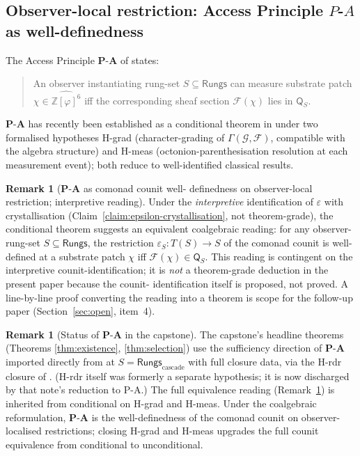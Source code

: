\documentclass[11pt, a4paper]{amsart}
\theoremstyle{definition}
\newtheorem{remark}[theorem]{Remark}
\newcommand{\Z}{\mathbb{Z}}
\newcommand{\Rungs}{\mathsf{Rungs}}
\newcommand{\Fcal}{\mathcal{F}}
\newcommand{\Gcal}{\mathcal{G}}
\newcommand{\Qalg}{\mathsf{Q}}
\begin{document}
\subsection{Observer-local restriction: Access Principle $P$-$A$
  as well-definedness}

The Access Principle $\mathbf{P\text{-}A}$ of
\cite[\S 4]{CascadeObserverQueryAlgebra} states:
\begin{quote}
An observer instantiating rung-set $S \subseteq \Rungs$ can
measure substrate patch $\chi \in \widehat{\Z[\varphi]^6}$ iff
the corresponding sheaf section $\Fcal(\chi)$ lies in $\Qalg_S$.
\end{quote}
$\mathbf{P\text{-}A}$ has recently been established as a
conditional theorem in \cite{CascadeAccessPrinciple} under two
formalised hypotheses H-grad (character-grading of
$\Gamma(\Gcal, \Fcal)$, compatible with the algebra structure)
and H-meas (octonion-parenthesisation resolution at each
measurement event); both reduce to well-identified classical
results.

\begin{remark}[$\mathbf{P\text{-}A}$ as comonad counit well-
  definedness on observer-local restriction; interpretive
  reading]
\label{thm:PA-wd}
Under the \emph{interpretive} identification of $\varepsilon$
with crystallisation (Claim~\ref{claim:epsilon-crystallisation},
not theorem-grade), the conditional theorem
\cite[Theorem P-A]{CascadeAccessPrinciple} suggests an
equivalent coalgebraic reading: for any observer-rung-set
$S \subseteq \Rungs$, the restriction
$\varepsilon_S \colon T(S) \to S$ of the comonad counit is
well-defined at a substrate patch $\chi$ iff $\Fcal(\chi)
\in \Qalg_S$. This reading is contingent on the interpretive
counit-identification; it is \emph{not} a theorem-grade
deduction in the present paper because the counit-
identification itself is proposed, not proved. A line-by-line
proof converting the reading into a theorem is scope for the
follow-up paper (Section~\ref{sec:open}, item~4).
\end{remark}

\begin{remark}[Status of $\mathbf{P\text{-}A}$ in the capstone]
\label{rmk:PA-status}
The capstone's headline theorems (Theorems \ref{thm:existence},
\ref{thm:selection}) use the sufficiency direction of
$\mathbf{P\text{-}A}$ imported directly from
\cite[Theorem P-A]{CascadeAccessPrinciple} at
$S = \Rungs_{\mathrm{cascade}}$ with full closure data, via
the H-rdr closure of \cite{CascadeHrdrClosure}. (H-rdr itself
was formerly a separate hypothesis; it is now discharged by
that note's reduction to P-A.) The full
equivalence reading (Remark~\ref{thm:PA-wd}) is inherited from
\cite{CascadeAccessPrinciple} conditional on H-grad and H-meas.
Under the coalgebraic reformulation, $\mathbf{P\text{-}A}$ is
the well-definedness of the comonad counit on observer-
localised restrictions; closing H-grad and H-meas upgrades the
full counit equivalence from conditional to unconditional.
\end{remark}
\end{document}
